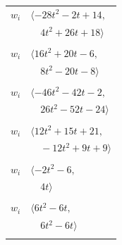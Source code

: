 \documentclass[11pt]{article}
\begin{document}
\begin{longtable}{@{}ll@{}}
$w_i$ & $\langle -28t^{2}-2t+14,$\\
 & $\quad 4t^{2}+26t+18\rangle$\\
\addlinespace[2pt]
\multicolumn{2}{@{}p{0.97\textwidth}@{}}{$i=28$, $D_i=2$, $\rho_{ij}$: $3{:}2, \allowbreak 5{:}3, \allowbreak 10{:}3, \allowbreak 13{:}1, \allowbreak 18{:}1, \allowbreak 20{:}2, \allowbreak 22{:}1, \allowbreak 23{:}2, \allowbreak 36{:}3, \allowbreak 37{:}2$}\\
$w_i$ & $\langle 16t^{2}+20t-6,$\\
 & $\quad 8t^{2}-20t-8\rangle$\\
\addlinespace[2pt]
\multicolumn{2}{@{}p{0.97\textwidth}@{}}{$i=29$, $D_i=1$, $\rho_{ij}$: $0{:}1, \allowbreak 3{:}1, \allowbreak 4{:}2, \allowbreak 10{:}3, \allowbreak 19{:}2, \allowbreak 20{:}2, \allowbreak 21{:}2, \allowbreak 22{:}3, \allowbreak 24{:}2, \allowbreak 32{:}3, \allowbreak 37{:}3$}\\
$w_i$ & $\langle -46t^{2}-42t-2,$\\
 & $\quad 26t^{2}-52t-24\rangle$\\
\addlinespace[2pt]
\multicolumn{2}{@{}p{0.97\textwidth}@{}}{$i=30$, $D_i=1$, $\rho_{ij}$: $6{:}3, \allowbreak 8{:}3, \allowbreak 12{:}1, \allowbreak 19{:}3, \allowbreak 20{:}2, \allowbreak 21{:}1, \allowbreak 32{:}3, \allowbreak 37{:}2$}\\
$w_i$ & $\langle 12t^{2}+15t+21,$\\
 & $\quad -12t^{2}+9t+9\rangle$\\
\addlinespace[2pt]
\multicolumn{2}{@{}p{0.97\textwidth}@{}}{$i=31$, $D_i=1$, $\rho_{ij}$: $22{:}2, \allowbreak 23{:}2, \allowbreak 35{:}2, \allowbreak 36{:}2$}\\
$w_i$ & $\langle -2t^{2}-6,$\\
 & $\quad 4t\rangle$\\
\addlinespace[2pt]
\multicolumn{2}{@{}p{0.97\textwidth}@{}}{$i=32$, $D_i=1$, $\rho_{ij}$: $2{:}2, \allowbreak 3{:}1, \allowbreak 4{:}3, \allowbreak 6{:}1, \allowbreak 18{:}1, \allowbreak 29{:}1, \allowbreak 30{:}1, \allowbreak 35{:}3, \allowbreak 37{:}3, \allowbreak 39{:}2$}\\
$w_i$ & $\langle 6t^{2}-6t,$\\
 & $\quad 6t^{2}-6t\rangle$\\
\addlinespace[2pt]
\multicolumn{2}{@{}p{0.97\textwidth}@{}}{$i=33$, $D_i=2$, $\rho_{ij}$: $2{:}3, \allowbreak 3{:}3, \allowbreak 6{:}2, \allowbreak 11{:}2, \allowbreak 17{:}3, \allowbreak 34{:}1, \allowbreak 36{:}1, \allowbreak 39{:}3$}\\

\end{longtable}
\end{document}
